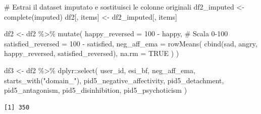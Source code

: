 \documentclass[
  11pt,
  a4paper,
  onecolumn]{article}
\newenvironment{Shaded}{}{}
\newcommand{\AttributeTok}[1]{\textcolor[rgb]{0.84,0.23,0.29}{#1}}
\newcommand{\CommentTok}[1]{\textcolor[rgb]{0.42,0.45,0.49}{#1}}
\newcommand{\ConstantTok}[1]{\textcolor[rgb]{0.00,0.36,0.77}{#1}}
\newcommand{\DecValTok}[1]{\textcolor[rgb]{0.00,0.36,0.77}{#1}}
\newcommand{\FunctionTok}[1]{\textcolor[rgb]{0.44,0.26,0.76}{#1}}
\newcommand{\NormalTok}[1]{\textcolor[rgb]{0.14,0.16,0.18}{#1}}
\newcommand{\OtherTok}[1]{\textcolor[rgb]{0.44,0.26,0.76}{#1}}
\newcommand{\SpecialCharTok}[1]{\textcolor[rgb]{0.00,0.36,0.77}{#1}}
\newcommand{\StringTok}[1]{\textcolor[rgb]{0.01,0.18,0.38}{#1}}
\begin{document}
\begin{Shaded}
\begin{Highlighting}[]
\CommentTok{\# Estrai il dataset imputato e sostituisci le colonne originali}
\NormalTok{df2\_imputed }\OtherTok{\textless{}{-}} \FunctionTok{complete}\NormalTok{(imputed)}
\NormalTok{df2[, items] }\OtherTok{\textless{}{-}}\NormalTok{ df2\_imputed[, items]}

\NormalTok{df2 }\OtherTok{\textless{}{-}}\NormalTok{ df2 }\SpecialCharTok{\%\textgreater{}\%}
  \FunctionTok{mutate}\NormalTok{(}
    \AttributeTok{happy\_reversed =} \DecValTok{100} \SpecialCharTok{{-}}\NormalTok{ happy, }\CommentTok{\# Scala 0{-}100}
    \AttributeTok{satisfied\_reversed =} \DecValTok{100} \SpecialCharTok{{-}}\NormalTok{ satisfied,}
    \AttributeTok{neg\_aff\_ema =} \FunctionTok{rowMeans}\NormalTok{(}
      \FunctionTok{cbind}\NormalTok{(sad, angry, happy\_reversed, satisfied\_reversed),}
      \AttributeTok{na.rm =} \ConstantTok{TRUE}
\NormalTok{    )}
\NormalTok{  )}
\end{Highlighting}
\end{Shaded}

\begin{Shaded}
\begin{Highlighting}[]
\NormalTok{df3 }\OtherTok{\textless{}{-}}\NormalTok{ df2 }\SpecialCharTok{\%\textgreater{}\%}
\NormalTok{  dplyr}\SpecialCharTok{::}\FunctionTok{select}\NormalTok{(}
\NormalTok{    user\_id, }
\NormalTok{    esi\_bf,}
\NormalTok{    neg\_aff\_ema, }
    \FunctionTok{starts\_with}\NormalTok{(}\StringTok{"domain\_"}\NormalTok{),}
\NormalTok{    pid5\_negative\_affectivity, pid5\_detachment, pid5\_antagonism, }
\NormalTok{    pid5\_disinhibition, pid5\_psychoticism }
\NormalTok{  )}
\end{Highlighting}
\end{Shaded}

\begin{Shaded}
\end{Shaded}

\begin{verbatim}
[1] 350
\end{verbatim}
\end{document}
